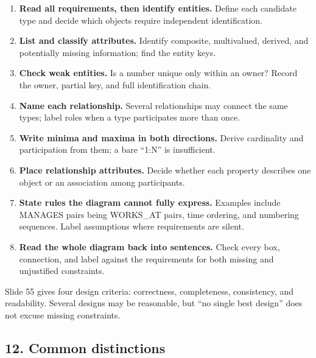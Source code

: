 \begin{enumerate}
\def\labelenumi{\arabic{enumi}.}
\tightlist
\item
  \textbf{Read all requirements, then identify entities.} Define each candidate type and decide which objects require independent identification.
\item
  \textbf{List and classify attributes.} Identify composite, multivalued, derived, and potentially missing information; find the entity keys.
\item
  \textbf{Check weak entities.} Is a number unique only within an owner? Record the owner, partial key, and full identification chain.
\item
  \textbf{Name each relationship.} Several relationships may connect the same types; label roles when a type participates more than once.
\item
  \textbf{Write minima and maxima in both directions.} Derive cardinality and participation from them; a bare ``1:N'' is insufficient.
\item
  \textbf{Place relationship attributes.} Decide whether each property describes one object or an association among participants.
\item
  \textbf{State rules the diagram cannot fully express.} Examples include MANAGES pairs being WORKS\_AT pairs, time ordering, and numbering sequences. Label assumptions where requirements are silent.
\item
  \textbf{Read the whole diagram back into sentences.} Check every box, connection, and label against the requirements for both missing and unjustified constraints.
\end{enumerate}

Slide 55 gives four design criteria: correctness, completeness, consistency, and readability. Several designs may be reasonable, but ``no single best design'' does not excuse missing constraints.

\subsection{12. Common distinctions}\label{02_er_modelling_en-common-distinctions}

